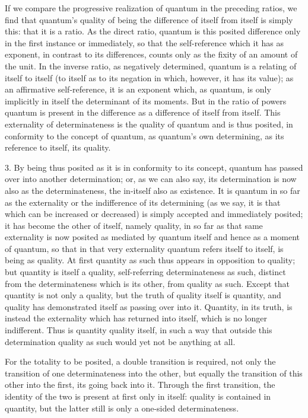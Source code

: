 If we compare the progressive realization
of quantum in the preceding ratios,
we find that quantum's quality of being
the difference of itself from itself is simply this:
that it is a ratio.
As the direct ratio, quantum is this posited difference
only in the first instance or immediately,
so that the self-reference which it has as exponent,
in contrast to its differences,
counts only as the fixity of an amount of the unit.
In the inverse ratio, as negatively determined,
quantum is a relating of itself to itself
(to itself as to its negation
in which, however, it has its value);
as an affirmative self-reference,
it is an exponent which, as quantum,
is only implicitly in itself the determinant of its moments.
But in the ratio of powers quantum is present
in the difference as a difference of itself from itself.
This externality of determinateness is
the quality of quantum and is thus posited,
in conformity to the concept of quantum,
as quantum's own determining,
as its reference to itself, its quality.

3. By being thus posited as it is in conformity to its concept,
quantum has passed over into another determination;
or, as we can also say, its determination is
now also as the determinateness,
the in-itself also as existence.
It is quantum in so far as the externality
or the indifference of its determining
(as we say, it is that which can be increased or decreased)
is simply accepted and immediately posited;
it has become the other of itself, namely quality,
in so far as that same externality is now posited
as mediated by quantum itself
and hence as a moment of quantum,
so that in that very externality
quantum refers itself to itself,
is being as quality.
At first quantity as such thus appears
in opposition to quality;
but quantity is itself a quality,
self-referring determinateness as such,
distinct from the determinateness which is its other,
from quality as such.
Except that quantity is not only a quality,
but the truth of quality itself is quantity,
and quality has demonstrated itself as passing over into it.
Quantity, in its truth, is instead the externality
which has returned into itself,
which is no longer indifferent.
Thus is quantity quality itself,
in such a way that outside this determination
quality as such would yet not be anything at all.

For the totality to be posited, a double transition is required,
not only the transition of one determinateness into the other,
but equally the transition of this other into the first,
its going back into it.
Through the first transition,
the identity of the two is present at first only in itself:
quality is contained in quantity,
but the latter still is only a one-sided determinateness.

